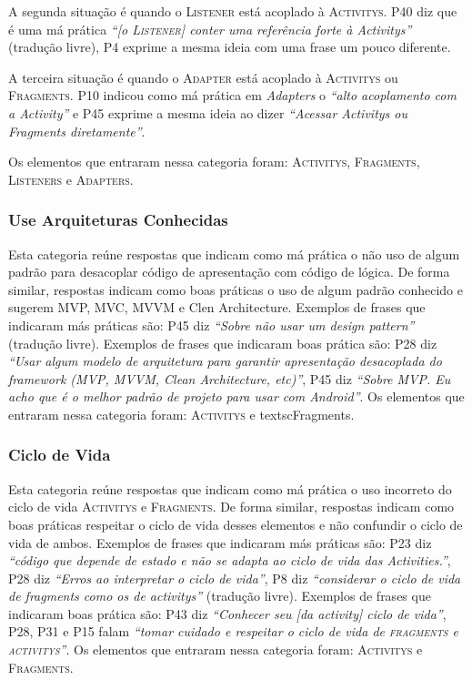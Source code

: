 A segunda situa\c{c}\~ao \'e quando o \textsc{Listener} est\'a acoplado \`a \textsc{Activitys}. P40 diz que \'e uma m\'a pr\'atica \textit{``[o \textsc{Listener}] conter uma refer\^encia forte \`a Activitys''} (tradu\c{c}\~ao livre), P4 exprime a mesma ideia com uma frase um pouco diferente. 

A terceira situa\c{c}\~ao \'e quando o \textsc{Adapter} est\'a acoplado \`a \textsc{Activitys} ou \textsc{Fragments}. P10 indicou como m\'a pr\'atica em \textit{Adapters} o \textit{``alto acoplamento com a Activity''} e P45 exprime a mesma ideia ao dizer \textit{``Acessar Activitys ou Fragments diretamente''}. 

Os elementos que entraram nessa categoria foram: \textsc{Activitys}, \textsc{Fragments}, \textsc{Listeners} e \textsc{Adapters}. 

\subsubsection{Use Arquiteturas Conhecidas}
Esta categoria re\'une respostas que indicam como m\'a pr\'atica o n\~ao uso de algum padr\~ao para desacoplar c\'odigo de apresenta\c{c}\~ao com c\'odigo de l\'ogica. De forma similar, respostas indicam como boas pr\'aticas o uso de algum padr\~ao conhecido e sugerem MVP, MVC, MVVM e Clen Architecture. Exemplos de frases que indicaram m\'as pr\'aticas s\~ao: P45 diz \textit{``Sobre n\~ao usar um design pattern''} (tradu\c{c}\~ao livre). Exemplos de frases que indicaram boas pr\'atica s\~ao: P28 diz \textit{``Usar algum modelo de arquitetura para garantir apresenta\c{c}\~ao desacoplada do framework (MVP, MVVM, Clean Architecture, etc)''}, P45 diz \textit{``Sobre MVP. Eu acho que \'e o melhor padr\~ao de projeto para usar com Android''}. Os elementos que entraram nessa categoria foram: \textsc{Activitys} e textsc{Fragments}. 


\subsubsection{Ciclo de Vida}
Esta categoria re\'une respostas que indicam como m\'a pr\'atica o uso incorreto do ciclo de vida \textsc{Activitys} e \textsc{Fragments}. De forma similar, respostas indicam como boas pr\'aticas respeitar o ciclo de vida desses elementos e n\~ao confundir o ciclo de vida de ambos. Exemplos de frases que indicaram m\'as pr\'aticas s\~ao: P23 diz \textit{``c\'odigo que depende de estado e n\~ao se adapta ao ciclo de vida das Activities.''}, P28 diz \textit{``Erros ao interpretar o ciclo de vida''}, P8 diz \textit{``considerar o ciclo de vida de fragments como os de activitys''} (tradu\c{c}\~ao livre). Exemplos de frases que indicaram boas pr\'atica s\~ao: P43 diz \textit{``Conhecer seu [da activity] ciclo de vida''}, P28, P31 e P15 falam \textit{``tomar cuidado e respeitar o ciclo de vida de \textsc{fragments} e \textsc{activitys}''}. Os elementos que entraram nessa categoria foram: \textsc{Activitys} e \textsc{Fragments}. 

